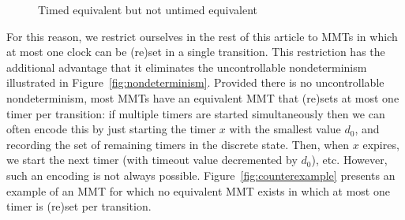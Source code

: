 \begin{figure}
\ifshort
\vspace{-1em}
\fi
\begin{center}

\caption{Timed equivalent but not untimed equivalent}
\label{fig:twoequivalentone}
\end{center}
\end{figure}
For this reason, we restrict ourselves in the rest of this article to MMTs in which at most
one clock can be (re)set in a single transition. This restriction has the additional advantage that it
eliminates the uncontrollable nondeterminism illustrated in Figure~\ref{fig:nondeterminism}.
Provided there is no uncontrollable nondeterminism, most MMTs
have an equivalent MMT that (re)sets at most one timer per transition:
if multiple timers are started simultaneously then we can often encode this by just
starting the timer $x$ with the smallest value $d_0$, and recording the set of remaining timers in the discrete state.
Then, when $x$ expires, we start the next timer (with timeout value decremented by $d_0$), etc.
However, such an encoding is not always possible. 
\iflong
Figure~\ref{fig:counterexample} presents an example of an MMT for which no equivalent MMT exists
in which at most one timer is (re)set per transition.
